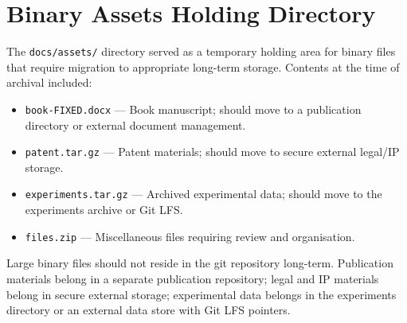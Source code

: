 
\section{Binary Assets Holding Directory}

The \texttt{docs/assets/} directory served as a temporary holding area for binary
files that require migration to appropriate long-term storage. Contents at the time
of archival included:

\begin{itemize}
  \item \texttt{book-FIXED.docx} --- Book manuscript; should move to a publication
        directory or external document management.
  \item \texttt{patent.tar.gz} --- Patent materials; should move to secure external
        legal/IP storage.
  \item \texttt{experiments.tar.gz} --- Archived experimental data; should move to
        the experiments archive or Git LFS.
  \item \texttt{files.zip} --- Miscellaneous files requiring review and organisation.
\end{itemize}

Large binary files should not reside in the git repository long-term. Publication
materials belong in a separate publication repository; legal and IP materials belong
in secure external storage; experimental data belongs in the experiments directory
or an external data store with Git LFS pointers.

